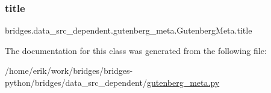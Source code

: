 \subsubsection{\texorpdfstring{title}{title}}
{\footnotesize\ttfamily bridges.\+data\+\_\+src\+\_\+dependent.\+gutenberg\+\_\+meta.\+Gutenberg\+Meta.\+title}



The documentation for this class was generated from the following file\+:\begin{DoxyCompactItemize}
\item 
/home/erik/work/bridges/bridges-\/python/bridges/data\+\_\+src\+\_\+dependent/\hyperlink{gutenberg__meta_8py}{gutenberg\+\_\+meta.\+py}\end{DoxyCompactItemize}
